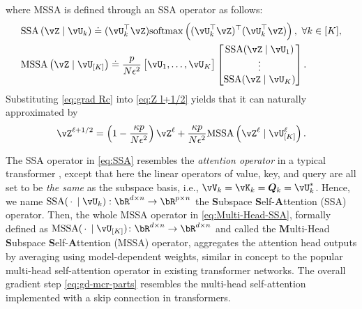 \documentclass[../../book-main.tex]{subfiles}
\begin{document}
where MSSA is defined through an SSA operator as follows:
\begin{align}
    & \mathrm{SSA}\left(\vZ \mid \vU_{k}\right) 
    \doteq (\vU_{k}^\top \vZ)\mathrm{softmax}\left((\vU_{k}^\top\vZ)^\top(\vU_{k}^\top\vZ)\right), \ \forall k \in [K], \label{eq:SSA} \\
    & \mathrm{MSSA}\left(\vZ \mid \vU_{[K]}\right) 
    \doteq \frac{p}{N\epsilon^2} \mat{\vU_{1}, \dots, \vU_{K}}\mat{\mathrm{SSA}({\vZ \mid \vU_{1}}) \\ \vdots \\ \mathrm{SSA}({\vZ \mid \vU_{K}})}.\label{eq:Multi-Head-SSA}
\end{align}  
Substituting \eqref{eq:grad Rc} into \eqref{eq:Z l+1/2} yields that it can naturally approximated by
\begin{equation}
    \vZ^{\ell + 1/2} = \left(1 - \frac{\kappa p}{N\epsilon^2}\right) \vZ^{\ell} + \frac{\kappa p}{N\epsilon^2} \mathrm{MSSA}\left({\vZ^{\ell} \mid \vU_{[K]}^{\ell}}\right).  \label{eq:gd-mcr-parts} 
\end{equation}



\begin{remark}
    The SSA operator in \eqref{eq:SSA} resembles the \textit{attention operator} in a typical transformer \citep{vaswani2017attention}, except that here the linear operators of value, key, and query  are all set to be \textit{the same} as the subspace basis, i.e., $\vV_{k} = \vK_{k} = \bm{Q}_{k} = \vU_k^*$. Hence, we name $\mathrm{SSA}({\spcdot\mid\vU_k}): \bR^{d\times n} \rightarrow \bR^{p\times n}$  the \textbf{S}ubspace \textbf{S}elf-\textbf{A}ttention (SSA) operator. Then, the whole MSSA operator in \eqref{eq:Multi-Head-SSA}, formally defined as \(\mathrm{MSSA}({\spcdot \mid \vU_{[K]}}) \colon \bR^{d \times n} \to \bR^{d \times n}\) and called the \textbf{M}ulti-Head \textbf{S}ubspace \textbf{S}elf-\textbf{A}ttention (MSSA) operator, aggregates the attention head outputs by averaging using model-dependent weights, similar in concept to the popular multi-head self-attention operator in existing transformer networks.  The overall gradient step \eqref{eq:gd-mcr-parts} resembles the multi-head self-attention implemented with a skip connection in transformers.  
\end{remark}
\end{document}
